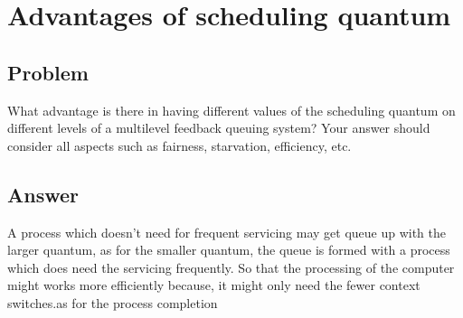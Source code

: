 \newpage
\section{Advantages of scheduling quantum}
\subsection{Problem}
What advantage is there in having different values of the scheduling quantum on different levels
of a multilevel feedback queuing system? Your answer should consider all aspects such as
fairness, starvation, efficiency, etc.

\subsection{Answer}
A process which doesn't need for frequent servicing may get queue up with the larger quantum, as for the smaller quantum, the queue is formed with a process which does need the servicing frequently. So that the processing of the computer might works more efficiently because,  it might only need the fewer context switches.as for the process completion
